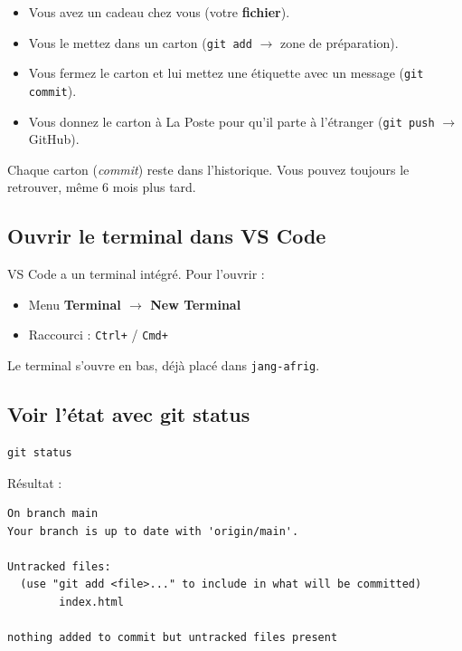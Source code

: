 \documentclass[11pt,a4paper]{article}
\begin{document}
\begin{retenirbox}
\begin{itemize}[nosep]
    \item Vous avez un cadeau chez vous (votre \textbf{fichier}).
    \item Vous le mettez dans un carton (\texttt{git add} $\to$ zone de préparation).
    \item Vous fermez le carton et lui mettez une étiquette avec un message (\texttt{git commit}).
    \item Vous donnez le carton à La Poste pour qu'il parte à l'étranger (\texttt{git push} $\to$ GitHub).
\end{itemize}
Chaque carton (\emph{commit}) reste dans l'historique. Vous pouvez toujours
le retrouver, même 6 mois plus tard.
\end{retenirbox}

\newpage

\subsection{Ouvrir le terminal dans VS Code}

VS Code a un terminal intégré. Pour l'ouvrir :
\begin{itemize}[nosep]
    \item Menu \textbf{Terminal $\to$ New Terminal}
    \item Raccourci : \texttt{Ctrl+\textasciigrave} / \texttt{Cmd+\textasciigrave}
\end{itemize}

Le terminal s'ouvre en bas, déjà placé dans \texttt{jang-afrig}.

\subsection{Voir l'état avec git status}

\begin{lstlisting}
git status
\end{lstlisting}

Résultat :
\begin{lstlisting}
On branch main
Your branch is up to date with 'origin/main'.

Untracked files:
  (use "git add <file>..." to include in what will be committed)
        index.html

nothing added to commit but untracked files present
\end{lstlisting}
\end{document}
